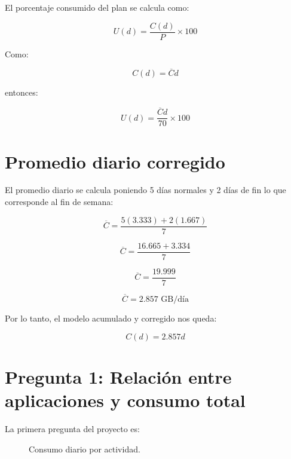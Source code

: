 \documentclass[12pt,a4paper]{article}
\begin{document}
\begin{center}
		El porcentaje consumido del plan se calcula como:
		
		\[
		U(d)=\frac{C(d)}{P}\times 100
		\]
		
		Como:
		
		\[
		C(d)=\overline{C}d
		\]
		
		entonces:
		
		\[
		U(d)=\frac{\overline{C}d}{70}\times100
		\]
		
		\section{Promedio diario corregido}
		
		El promedio diario se calcula poniendo 5 días normales y 2 días de fin lo que corresponde al fin de semana:
		
		\[
		\overline{C}=\frac{5(3.333)+2(1.667)}{7}
		\]
		
		\[
		\overline{C}=\frac{16.665+3.334}{7}
		\]
		
		\[
		\overline{C}=\frac{19.999}{7}
		\]
		
		\[
		\overline{C}=2.857\text{ GB/día}
		\]
		
		Por lo tanto, el modelo acumulado y corregido nos queda:
		
		\[
		\boxed{C(d)=2.857d}
		\]
		
		\section{Pregunta 1: Relación entre aplicaciones y consumo total}
		
		La primera pregunta del proyecto es:
		
		\begin{quote}
		\end{quote}
		
		\begin{figure}[H]
			\centering
			\caption{Consumo diario por actividad.}
		\end{figure}
		

\end{center}
\end{document}

